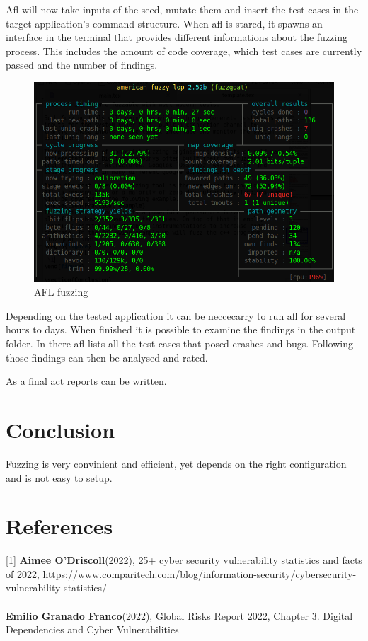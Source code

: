 \documentclass[journal=tosc,final]{iacrtrans}
\begin{document}
Afl will now take inputs of the seed, mutate them and insert the test cases in the target application’s command structure.
When afl is stared, it spawns an interface in the terminal that provides different informations about the fuzzing process. This includes the amount of code coverage, which test cases are currently passed and the number of findings. 
\begin{figure}[h]
 \caption{AFL fuzzing}
 \begin{center}
   \includegraphics[scale=0.3]{afl.png}

 \end{center}
\end{figure}
\newpage
Depending on the tested application it can be neccecarry to run afl for several hours to days. When finished it is possible to examine the findings in the output folder. In there afl lists all the test cases that posed crashes and bugs. Following those findings can then be analysed and rated.

As a final act reports can be written.


\section{Conclusion}
Fuzzing is very convinient and efficient, yet depends on the right configuration and is not easy to setup.
\section{References}
[1] \textbf{Aimee O'Driscoll}(2022), 25+ cyber security vulnerability statistics and facts of 2022, https://www.comparitech.com/blog/information-security/cybersecurity-vulnerability-statistics/\\
\\
\noindent[2] \textbf{Emilio Granado Franco}(2022),  Global Risks Report 2022, Chapter 3. Digital Dependencies and Cyber Vulnerabilities\\
\end{document}
